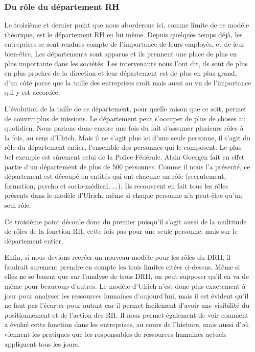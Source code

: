 \subsubsection{Du rôle du département RH}

Le troisième et dernier point que nous aborderons ici, comme limite de ce modèle théorique, est le département RH en lui même. Depuis quelques temps déjà, les entreprises se sont rendues compte de l'importance de leurs employés, et de leur bien-être. Les départements sont apparus et ils prennent une place de plus en plus importante dans les sociétés. Les intervenants nous l'ont dit, ils sont de plus en plus proches de la direction et leur département est de plus en plus grand, d'un côté parce que la taille des entreprises croît mais aussi au vu de l'importance qui y est accordée. \newline
{}

L'évolution de la taille de ce département, pour quelle raison que ce soit, permet de couvrir plus de missions. Le département peut s'occuper de plus de choses au quotidien. Nous parlons donc encore une fois du fait d'assumer plusieurs rôles à la fois, au sens d'Ulrich. Mais il ne s'agit plus ici d'une seule personne, il s'agit du rôle du département entier, l'ensemble des personnes qui le composent. Le plus bel exemple est sûrement celui de la Police Fédérale. Alain Goergen fait en effet partie d'un département de plus de 500 personnes. Comme il nous l'a présenté, ce département est découpé en entités qui ont chacune un rôle (recrutement, formation, psycho et socio-médical, ...). Ils recouvrent en fait tous les rôles présents dans le modèle d'Ulrich, même si chaque personne n'a peut-être qu'un seul rôle. \newline

Ce troisième point découle donc du premier puisqu'il s'agit aussi de la multitude de rôles de la fonction RH, cette fois pas pour une seule personne, mais sur le département entier. \newline

Enfin, si nous devions recréer un nouveau modèle pour les rôles du DRH, il faudrait surement prendre en compte les trois limites citées ci-dessus. Même si elles ne se basent que sur l'analyse de trois DRH, on peut supposer qu'il en va de même pour beaucoup d'autres. Le modèle d'Ulrich n'est donc plus exactement à jour pour analyser les ressources humaines d'aujourd'hui, mais il est évident qu'il ne faut pas l'écarter pour autant car il permet facilement d'avoir une visibilité du positionnement et de l'action des RH. Il nous permet également de voir comment a évolué cette fonction dans les entreprises, au cours de l'histoire, mais aussi d'où viennent les pratiques que les responsables de ressources humaines actuels appliquent tous les jours. \\
